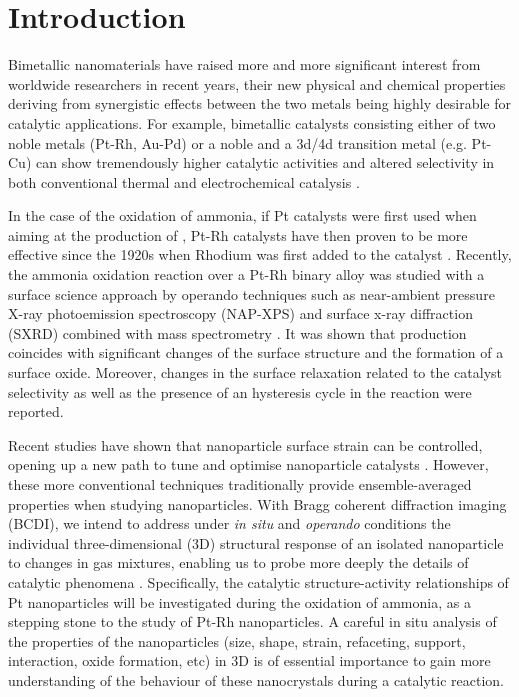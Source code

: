 \section{Introduction}

Bimetallic nanomaterials have raised more and more significant interest from worldwide researchers in recent years, their new physical and chemical properties deriving from synergistic effects between the two metals being highly desirable for catalytic applications.
For example, bimetallic catalysts consisting either of two noble metals (Pt-Rh, Au-Pd) or a noble and a 3d/4d transition metal (e.g. Pt-Cu) can show tremendously higher catalytic activities and altered selectivity in both conventional thermal and electrochemical catalysis \parencite{Resta2020a, Carnis2021b}.

In the case of the oxidation of ammonia, if Pt catalysts were first used when aiming at the production of \nitricoxide, Pt-Rh catalysts have then proven to be more effective since the 1920s when Rhodium was first added to the catalyst \parencite{Handforth1934, Heck1982}.
Recently, the ammonia oxidation reaction over a Pt-Rh binary alloy was studied with a surface science approach by operando techniques such as near-ambient pressure X-ray photoemission spectroscopy (NAP-XPS) and surface x-ray diffraction (SXRD) combined with mass spectrometry \parencite{Resta2020a}.
It was shown that \nitricoxide production coincides with significant changes of the surface structure and the formation of a  surface oxide.
Moreover, changes in the surface relaxation related to the catalyst selectivity as well as the presence of an hysteresis cycle in the reaction were reported.

Recent studies have shown that nanoparticle surface strain can be controlled, opening up a new path to tune and optimise nanoparticle catalysts \parencite{Zhang2014, Sneed2015, Wang2016}.
However, these more conventional techniques traditionally provide ensemble-averaged properties when studying nanoparticles.
With Bragg coherent diffraction imaging (BCDI), we intend to address under \textit{in situ} and \textit{operando} conditions the individual three-dimensional (3D) structural response of an isolated nanoparticle to changes in gas mixtures, enabling us to probe more deeply the details of catalytic phenomena \parencite{Fernandez2019, Passos2020, Dupraz2022}.
Specifically, the catalytic structure-activity relationships of Pt nanoparticles will be investigated during the oxidation of ammonia, as a stepping stone to the study of Pt-Rh nanoparticles.
A careful in situ analysis of the properties of the nanoparticles (size, shape, strain, refaceting, support, interaction, oxide formation, etc) in 3D is of essential importance to gain more understanding of the behaviour of these nanocrystals during a catalytic reaction.

